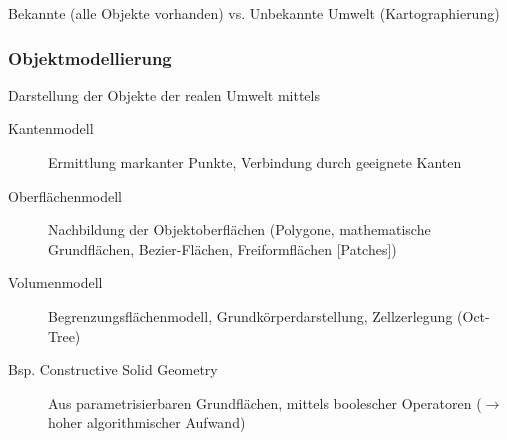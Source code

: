 Bekannte (alle Objekte vorhanden) vs. Unbekannte Umwelt (Kartographierung)

\subsubsection{Objektmodellierung}

Darstellung der Objekte der realen Umwelt mittels

\begin{description}
	\item[Kantenmodell] Ermittlung markanter Punkte, Verbindung durch geeignete Kanten
	\item[Oberflächenmodell] Nachbildung der Objektoberflächen (Polygone, mathematische Grundflächen, Bezier-Flächen, Freiformflächen [Patches])
	\item[Volumenmodell] Begrenzungsflächenmodell, Grundkörperdarstellung, Zellzerlegung (Oct-Tree)
	\item[Bsp. Constructive Solid Geometry] Aus parametrisierbaren Grundflächen, mittels boolescher Operatoren ($\to$ hoher algorithmischer Aufwand)
\end{description}


